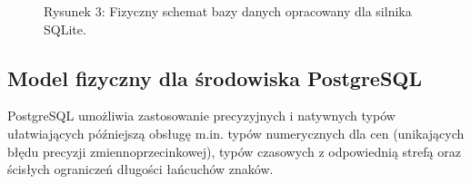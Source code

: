 \documentclass[letterpaper,10pt,polish]{sphinxmanual}
\begin{document}
\begin{figure}[htbp]
\centering
\capstart

\noindent{}
\caption{Rysunek 3: Fizyczny schemat bazy danych opracowany dla silnika SQLite.}\label{\detokenize{rozdzia_u0142_3/BD_PlanBazyDanych_zad1/index:id3}}\end{figure}


\subsection{Model fizyczny dla środowiska PostgreSQL}
\label{\detokenize{rozdzia_u0142_3/BD_PlanBazyDanych_zad1/index:model-fizyczny-dla-srodowiska-postgresql}}
\sphinxAtStartPar
PostgreSQL umożliwia zastosowanie precyzyjnych i natywnych typów ułatwiających późniejszą obsługę \textendash{} m.in. typów numerycznych dla cen (unikających błędu precyzji zmiennoprzecinkowej), typów czasowych z odpowiednią strefą oraz ścisłych ograniczeń długości łańcuchów znaków.
\end{document}
